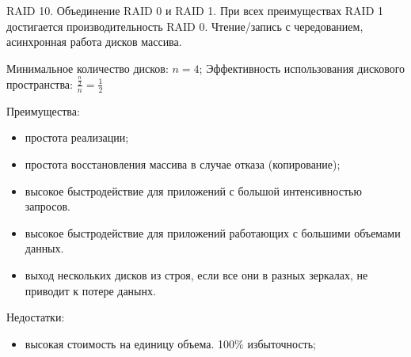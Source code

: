 RAID 10. Объединение RAID 0 и RAID 1. При всех преимуществах RAID 1 достигается производительность RAID 0. Чтение/запись с чередованием, асинхронная работа дисков массива.

Минимальное количество дисков: $n=4$; Эффективность использования дискового пространства: $\frac{\frac{n}{2}}{n}=\frac{1}{2}$

Преимущества:
\begin{itemize}
    \item простота реализации;
    \item простота восстановления массива в случае отказа (копирование);
    \item высокое быстродействие для приложений с большой интенсивностью запросов.
    \item высокое быстродействие для приложений работающих с большими объемами данных.
    \item выход нескольких дисков из строя, если все они в разных зеркалах, не приводит к потере данынх.
\end{itemize}

Недостатки:
\begin{itemize}
    \item высокая стоимость на единицу объема. 100\% избыточность;
\end{itemize}


